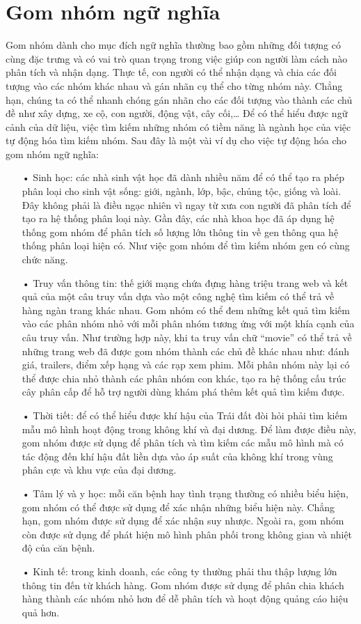 \section{Gom nhóm ngữ nghĩa}
Gom nhóm dành cho mục đích ngữ nghĩa thường bao gồm những đối tượng có cùng đặc trưng và có vai trò quan trọng trong việc giúp con người làm cách nào phân tích và nhận dạng.
Thực tế, con người có thể nhận dạng và chia các đối tượng vào các nhóm khác nhau và gán nhãn cụ thể cho từng nhóm này.
Chẳng hạn, chúng ta có thể nhanh chóng gán nhãn cho các đối tượng vào thành các chủ đề như xây dựng, xe cộ, con người, động vật, cây cối,\ldots
Để có thể hiểu được ngữ cảnh của dữ liệu, việc tìm kiếm những nhóm có tiềm năng là ngành học của việc tự động hóa tìm kiếm nhóm.
Sau đây là một vài ví dụ cho việc tự động hóa cho gom nhóm ngữ nghĩa:
\begin{enumerate}
\item[•]Sinh học: các nhà sinh vật học đã dành nhiều năm để có thể tạo ra phép phân loại cho sinh vật sống: giới, ngành, lớp, bậc, chủng tộc, giống và loài.
Đây không phải là điều ngạc nhiên vì ngay từ xưa con người đã phân tích để tạo ra hệ thống phân loại này.
Gần đây, các nhà khoa học đã áp dụng hệ thống gom nhóm để phân tích số lượng lớn thông tin về gen thông qua hệ thống phân loại hiện có.
Như việc gom nhóm để tìm kiếm nhóm gen có cùng chức năng.
\item[•]Truy vấn thông tin: thế giới mạng chứa đựng hàng triệu trang web và kết quả của một câu truy vấn dựa vào một công nghệ tìm kiếm có thể trả về hàng ngàn trang khác nhau.
Gom nhóm có thể đem những kết quả tìm kiếm vào các phân nhóm nhỏ với mỗi phân nhóm tương ứng với một khía cạnh của câu truy vấn.
Như trường hợp này, khi ta truy vấn chữ ``movie'' có thể trả về những trang web  đã được gom nhóm thành các chủ đề khác nhau như: đánh giá, trailers, điểm xếp hạng và các rạp xem phim.
Mỗi phân nhóm này lại có thể được chia nhỏ thành các phân nhóm con khác, tạo ra hệ thống cấu trúc cây phân cấp để hỗ trợ người dùng khám phá thêm kết quả tìm kiếm được.
\item[•]Thời tiết: để có thể hiểu được khí hậu của Trái đất đòi hỏi phải tìm kiếm mẫu mô hình hoạt động trong không khí và đại dương.
Để làm được điều này, gom nhóm được sử dụng để phân tích và tìm kiếm các mẫu mô hình mà có tác động đến khí hậu đất liền dựa vào áp suất của không khí trong vùng phân cực và khu vực của đại dương.
\item[•]Tâm lý và y học: mỗi căn bệnh hay tình trạng thường có nhiều biểu hiện, gom nhóm có thể được sử dụng để xác nhận những biểu hiện này.
Chẳng hạn, gom nhóm được sử dụng để xác nhận suy nhược.
Ngoài ra, gom nhóm còn được sử dụng để phát hiện mô hình phân phối trong không gian và nhiệt độ của căn bệnh.
\item[•]Kinh tế: trong kinh doanh, các công ty thường phải thu thập lượng lớn thông tin đến từ khách hàng.
Gom nhóm được sử dụng để phân chia khách hàng thành các nhóm nhỏ hơn để dễ phân tích và hoạt động quảng cáo hiệu quả hơn.
\end{enumerate}

